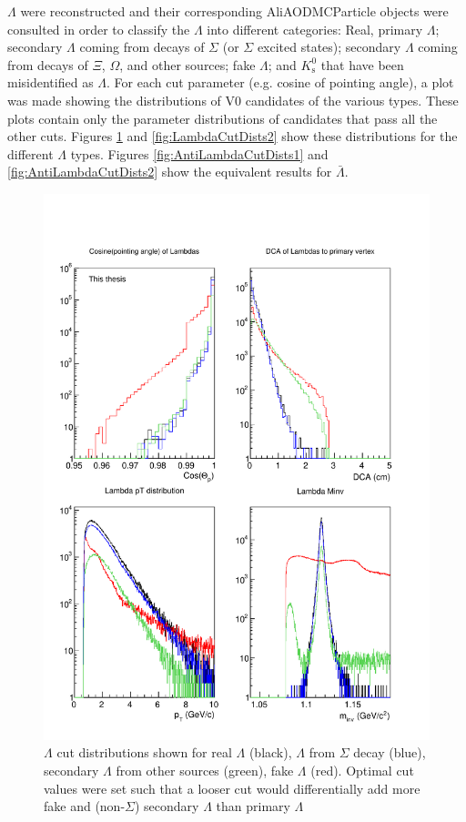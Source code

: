 $\Lambda$ were reconstructed and their corresponding AliAODMCParticle objects were consulted in order to classify the $\Lambda$ into different categories: Real, primary $\Lambda$; secondary $\Lambda$ coming from decays of $\Sigma$ (or $\Sigma$ excited states); secondary $\Lambda$ coming from decays of $\Xi$, $\Omega$, and other sources; fake $\Lambda$; and $K^0_\mathrm{s}$ that have been misidentified as $\Lambda$.  
For each cut parameter (e.g. cosine of pointing angle), a plot was made showing the distributions of V0 candidates of the various types.  
These plots contain only the parameter distributions of candidates that pass all the other cuts.  Figures \ref{fig:LambdaCutDists1} and \ref{fig:LambdaCutDists2} show these distributions for the different $\Lambda$ types.  
Figures \ref{fig:AntiLambdaCutDists1} and \ref{fig:AntiLambdaCutDists2} show the equivalent results for $\bar{\Lambda}$.

\begin{figure}
\includegraphics[width=36pc]{Figures/2014-03-31-Distribution-Lambda-4Types-CosP-DCA-pT-Minv.pdf}
\caption[$\Lambda$ cut distributions]{$\Lambda$ cut distributions shown for real $\Lambda$ (black), $\Lambda$ from $\Sigma$ decay (blue), secondary $\Lambda$ from other sources (green), fake $\Lambda$ (red). 
Optimal cut values were set such that a looser cut would differentially add more fake and (non-$\Sigma$) secondary $\Lambda$ than primary $\Lambda$}
\label{fig:LambdaCutDists1}
\end{figure}

